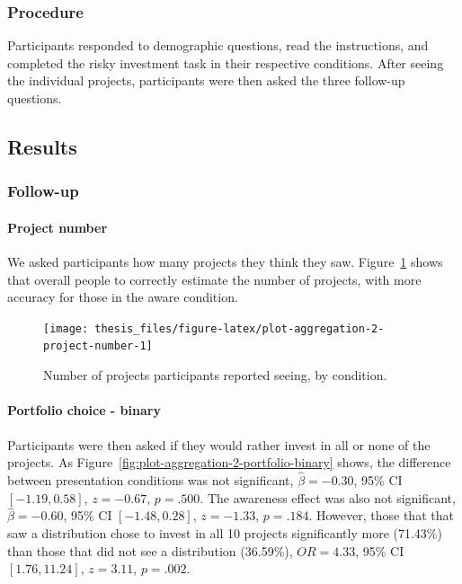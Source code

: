 \documentclass[a4paper, nobind, dvipsnames]{templates/ociamthesis}
\theoremstyle{definition}
\theoremstyle{definition}
\theoremstyle{definition}
\theoremstyle{definition}
\theoremstyle{remark}
\begin{document}
\subsubsection{Procedure}

Participants responded to demographic questions, read the instructions, and
completed the risky investment task in their respective conditions. After seeing
the individual projects, participants were then asked the three follow-up
questions.

\hypertarget{results-aggregation-2-appendix}{%
\subsection{Results}\label{results-aggregation-2-appendix}}

\subsubsection{Follow-up}

\paragraph{Project number}

We asked participants how many projects they think they saw.
Figure~\ref{fig:plot-aggregation-2-project-number} shows that overall people
to correctly estimate the number of projects, with more accuracy for those in
the aware condition.



\begin{figure}
\texttt{[image: thesis\_files/figure-latex/plot-aggregation-2-project-number-1]} \caption{Number of projects participants reported seeing, by condition.}\label{fig:plot-aggregation-2-project-number}
\end{figure}

\paragraph{Portfolio choice - binary}

Participants were then asked if they would rather invest in all or none of the
projects. As Figure~\ref{fig:plot-aggregation-2-portfolio-binary} shows, the
difference between presentation conditions was not significant,
\(\hat{\beta} = -0.30\), 95\% CI \([-1.19, 0.58]\), \(z = -0.67\), \(p = .500\). The
awareness effect was also not significant,
\(\hat{\beta} = -0.60\), 95\% CI \([-1.48, 0.28]\), \(z = -1.33\), \(p = .184\). However,
those that that saw a distribution chose to invest in all 10 projects
significantly more
(71.43\%) than
those that did not see a distribution
(36.59\%),
\(OR = 4.33\), 95\% CI \([1.76, 11.24]\), \(z = 3.11\), \(p = .002\).
\end{document}
